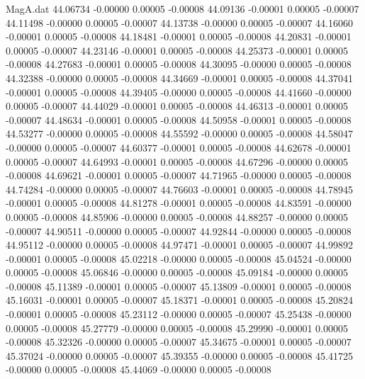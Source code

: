 \begin{filecontents}{MagA.dat}
  44.06734   -0.00000    0.00005   -0.00008
  44.09136   -0.00001    0.00005   -0.00007
  44.11498   -0.00000    0.00005   -0.00007
  44.13738   -0.00000    0.00005   -0.00007
  44.16060   -0.00001    0.00005   -0.00008
  44.18481   -0.00001    0.00005   -0.00008
  44.20831   -0.00001    0.00005   -0.00007
  44.23146   -0.00001    0.00005   -0.00008
  44.25373   -0.00001    0.00005   -0.00008
  44.27683   -0.00001    0.00005   -0.00008
  44.30095   -0.00000    0.00005   -0.00008
  44.32388   -0.00000    0.00005   -0.00008
  44.34669   -0.00001    0.00005   -0.00008
  44.37041   -0.00001    0.00005   -0.00008
  44.39405   -0.00000    0.00005   -0.00008
  44.41660   -0.00000    0.00005   -0.00007
  44.44029   -0.00001    0.00005   -0.00008
  44.46313   -0.00001    0.00005   -0.00007
  44.48634   -0.00001    0.00005   -0.00008
  44.50958   -0.00001    0.00005   -0.00008
  44.53277   -0.00000    0.00005   -0.00008
  44.55592   -0.00000    0.00005   -0.00008
  44.58047   -0.00000    0.00005   -0.00007
  44.60377   -0.00001    0.00005   -0.00008
  44.62678   -0.00001    0.00005   -0.00007
  44.64993   -0.00001    0.00005   -0.00008
  44.67296   -0.00000    0.00005   -0.00008
  44.69621   -0.00001    0.00005   -0.00007
  44.71965   -0.00000    0.00005   -0.00008
  44.74284   -0.00000    0.00005   -0.00007
  44.76603   -0.00001    0.00005   -0.00008
  44.78945   -0.00001    0.00005   -0.00008
  44.81278   -0.00001    0.00005   -0.00008
  44.83591   -0.00000    0.00005   -0.00008
  44.85906   -0.00000    0.00005   -0.00008
  44.88257   -0.00000    0.00005   -0.00007
  44.90511   -0.00000    0.00005   -0.00007
  44.92844   -0.00000    0.00005   -0.00008
  44.95112   -0.00000    0.00005   -0.00008
  44.97471   -0.00001    0.00005   -0.00007
  44.99892   -0.00001    0.00005   -0.00008
  45.02218   -0.00000    0.00005   -0.00008
  45.04524   -0.00000    0.00005   -0.00008
  45.06846   -0.00000    0.00005   -0.00008
  45.09184   -0.00000    0.00005   -0.00008
  45.11389   -0.00001    0.00005   -0.00007
  45.13809   -0.00001    0.00005   -0.00008
  45.16031   -0.00001    0.00005   -0.00007
  45.18371   -0.00001    0.00005   -0.00008
  45.20824   -0.00001    0.00005   -0.00008
  45.23112   -0.00000    0.00005   -0.00007
  45.25438   -0.00000    0.00005   -0.00008
  45.27779   -0.00000    0.00005   -0.00008
  45.29990   -0.00001    0.00005   -0.00008
  45.32326   -0.00000    0.00005   -0.00007
  45.34675   -0.00001    0.00005   -0.00007
  45.37024   -0.00000    0.00005   -0.00007
  45.39355   -0.00000    0.00005   -0.00008
  45.41725   -0.00000    0.00005   -0.00008
  45.44069   -0.00000    0.00005   -0.00008

\end{filecontents}
